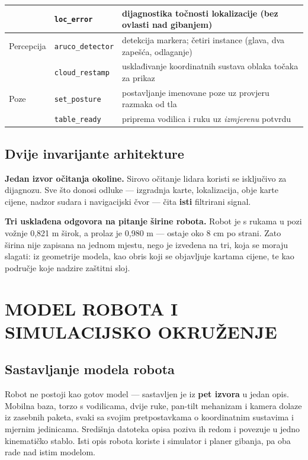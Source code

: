 \documentclass[12pt,a4paper]{article}
\begin{document}
\begin{table}[!htbp]
\begin{tabularx}{\textwidth}{@{}l l X@{}}
                     & \texttt{loc\_error}           & dijagnostika točnosti lokalizacije (bez ovlasti nad gibanjem) \\
        \midrule
        Percepcija   & \texttt{aruco\_detector}      & detekcija markera; četiri instance (glava, dva zapešća, odlaganje) \\
                     & \texttt{cloud\_restamp}       & usklađivanje koordinatnih sustava oblaka točaka za prikaz \\
        \midrule
        Poze         & \texttt{set\_posture}         & postavljanje imenovane poze uz provjeru razmaka od tla \\
                     & \texttt{table\_ready}         & priprema vodilica i ruku uz \textit{izmjerenu} potvrdu \\
        \bottomrule
    \end{tabularx}
\end{table}

\subsection{Dvije invarijante arhitekture}

\textbf{Jedan izvor očitanja okoline.} Sirovo očitanje lidara koristi se isključivo za dijagnozu.
Sve što donosi odluke --- izgradnja karte, lokalizacija, obje karte cijene, nadzor sudara i
navigacijski čvor --- čita \textbf{isti} filtrirani signal.

\textbf{Tri usklađena odgovora na pitanje širine robota.} Robot je s rukama u pozi vožnje
0,821 m širok, a prolaz je 0,980 m --- ostaje oko 8 cm po strani. Zato širina nije zapisana na
jednom mjestu, nego je izvedena na tri, koja se moraju slagati: iz geometrije modela, kao obris
koji se objavljuje kartama cijene, te kao područje koje nadzire zaštitni sloj.

\section{MODEL ROBOTA I SIMULACIJSKO OKRUŽENJE}
\label{sec:model}

\subsection{Sastavljanje modela robota}

Robot ne postoji kao gotov model --- sastavljen je iz \textbf{pet izvora} u jedan opis. Mobilna
baza, torzo s vodilicama, dvije ruke, pan-tilt mehanizam i kamera dolaze iz zasebnih paketa,
svaki sa svojim pretpostavkama o koordinatnim sustavima i mjernim jedinicama. Središnja datoteka
opisa poziva ih redom i povezuje u jedno kinematičko stablo. Isti opis robota koriste i simulator
i planer gibanja, pa oba rade nad istim modelom.
\end{document}
